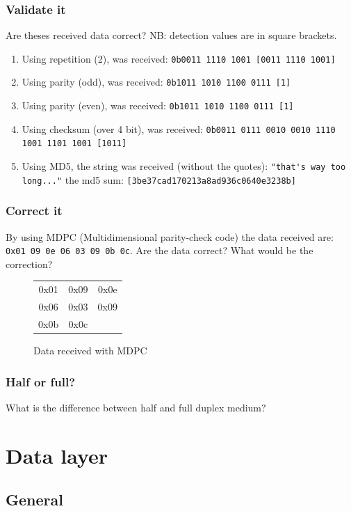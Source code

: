 \documentclass[11pt]{article}
\begin{document}
\subsubsection{Validate it}
Are theses received data correct? NB: detection values are in square brackets.
  \begin{enumerate}
    \item Using repetition (2), was received: \verb$0b0011 1110 1001 [0011 1110 1001]$
    \item Using parity (odd), was received:  \verb$0b1011 1010 1100 0111 [1]$
    \item Using parity (even), was received: \verb$0b1011 1010 1100 0111 [1]$
    \item Using checksum (over 4 bit), was received: \verb$0b0011 0111 0010 0010 1110 1001 1101 1001 [1011]$
    \item Using MD5, the string was received (without the quotes): \verb$"that's way too long..."$ the md5 sum: \verb$[3be37cad170213a8ad936c0640e3238b]$
  \end{enumerate}


\subsubsection{Correct it}
By using MDPC (Multidimensional parity-check code) the data received are: \verb$0x01 09 0e 06 03 09 0b 0c$. Are the data correct? What would be the correction? \\
  \begin{figure}[h]
    \centering
    \begin{tabular}{cc|c}
      0x01 & 0x09 & 0x0e \\
      0x06 & 0x03 & 0x09 \\ \hline
      0x0b & 0x0c &
    \end{tabular}
    \caption{Data received with MDPC}
    \label{fig:ami}
  \end{figure}

\subsubsection{Half or full?}
What is the difference between half and full duplex medium?

\section{Data layer}
\subsection{General}
\end{document}

